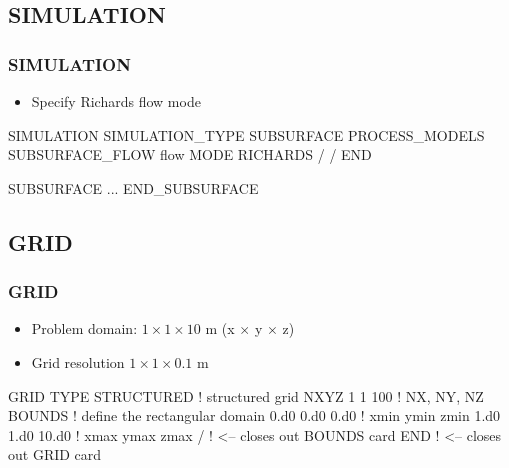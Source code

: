 \documentclass{beamer}
\newcommand\bluecomment[1]{{{\color{blue} #1}}}
\begin{document}
\subsection{SIMULATION}

\begin{frame}[fragile]\frametitle{SIMULATION}

\begin{itemize}
\item Specify Richards flow mode
\end{itemize}


\begin{semiverbatim}

SIMULATION
  SIMULATION_TYPE SUBSURFACE
  PROCESS_MODELS
    SUBSURFACE_FLOW flow
      MODE RICHARDS
    /
  /
END

SUBSURFACE
 ...
END_SUBSURFACE
\end{semiverbatim}

\end{frame}

\subsection{GRID}
\begin{frame}\frametitle{GRID}

\begin{itemize}
  \item Problem domain: $1 \times 1 \times 10$ m (x $\times$ y $\times$ z)
  \item Grid resolution $1 \times 1 \times 0.1$ m
\end{itemize}

\begin{semiverbatim}
GRID
  TYPE STRUCTURED        \bluecomment{! structured grid}
  NXYZ 1 1 100           \bluecomment{! NX, NY, NZ}
  BOUNDS             \bluecomment{! define the rectangular domain}
    0.d0 0.d0 0.d0   \bluecomment{! xmin ymin zmin}
    1.d0 1.d0 10.d0  \bluecomment{! xmax ymax zmax}
  /  \bluecomment{! <-- closes out BOUNDS card}
END  \bluecomment{! <-- closes out GRID card}
\end{semiverbatim}

\end{frame}

\end{document}
